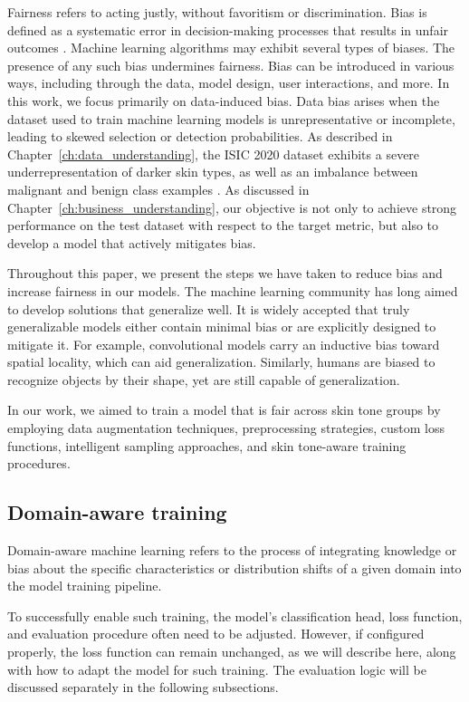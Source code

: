 Fairness refers to acting justly, without favoritism or discrimination.  
Bias is defined as a systematic error in decision-making processes that results in unfair outcomes \cite{bias_vs_fairness}. Machine learning algorithms may exhibit several types of biases. The presence of any such bias undermines fairness. Bias can be introduced in various ways, including through the data, model design, user interactions, and more. In this work, we focus primarily on data-induced bias. Data bias arises when the dataset used to train machine learning models is unrepresentative or incomplete, leading to skewed selection or detection probabilities. As described in Chapter~\ref{ch:data_understanding}, the ISIC 2020 dataset exhibits a severe underrepresentation of darker skin types, as well as an imbalance between malignant and benign class examples \cite{fairness_review}. As discussed in Chapter~\ref{ch:business_understanding}, our objective is not only to achieve strong performance on the test dataset with respect to the target metric, but also to develop a model that actively mitigates bias.

Throughout this paper, we present the steps we have taken to reduce bias and increase fairness in our models. The machine learning community has long aimed to develop solutions that generalize well. It is widely accepted that truly generalizable models either contain minimal bias or are explicitly designed to mitigate it. For example, convolutional models carry an inductive bias toward spatial locality, which can aid generalization. Similarly, humans are biased to recognize objects by their shape, yet are still capable of generalization.

In our work, we aimed to train a model that is fair across skin tone groups by employing data augmentation techniques, preprocessing strategies, custom loss functions, intelligent sampling approaches, and skin tone-aware training procedures.

\subsection{Domain-aware training}

Domain-aware machine learning refers to the process of integrating knowledge or bias about the specific characteristics or distribution shifts of a given domain into the model training pipeline.

To successfully enable such training, the model's classification head, loss function, and evaluation procedure often need to be adjusted. However, if configured properly, the loss function can remain unchanged, as we will describe here, along with how to adapt the model for such training. The evaluation logic will be discussed separately in the following subsections.

